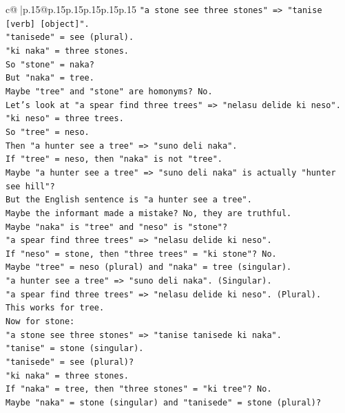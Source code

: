 \documentclass{article}
\begin{document}
{\begin{supertabular}{c@{$\;$}|p{.15\linewidth}@{}p{.15\linewidth}p{.15\linewidth}p{.15\linewidth}p{.15\linewidth}p{.15\linewidth}}
{{{\texttt{"a stone see three stones" => "tanise {[}verb{]} {[}object{]}".} \\
\texttt{"tanisede" = see (plural).} \\
\texttt{"ki naka" = three stones.} \\
\texttt{So "stone" = naka?} \\
\texttt{But "naka" = tree.} \\
\texttt{Maybe "tree" and "stone" are homonyms? No.} \\
\texttt{Let's look at "a spear find three trees" => "nelasu delide ki neso".} \\
\texttt{"ki neso" = three trees.} \\
\texttt{So "tree" = neso.} \\
\texttt{Then "a hunter see a tree" => "suno deli naka".} \\
\texttt{If "tree" = neso, then "naka" is not "tree".} \\
\texttt{Maybe "a hunter see a tree" => "suno deli naka" is actually "hunter see hill"?} \\
\texttt{But the English sentence is "a hunter see a tree".} \\
\texttt{Maybe the informant made a mistake? No, they are truthful.} \\
\texttt{Maybe "naka" is "tree" and "neso" is "stone"?} \\
\texttt{"a spear find three trees" => "nelasu delide ki neso".} \\
\texttt{If "neso" = stone, then "three trees" = "ki stone"? No.} \\
\texttt{Maybe "tree" = neso (plural) and "naka" = tree (singular).} \\
\texttt{"a hunter see a tree" => "suno deli naka". (Singular).} \\
\texttt{"a spear find three trees" => "nelasu delide ki neso". (Plural).} \\
\texttt{This works for tree.} \\
\texttt{Now for stone:} \\
\texttt{"a stone see three stones" => "tanise tanisede ki naka".} \\
\texttt{"tanise" = stone (singular).} \\
\texttt{"tanisede" = see (plural)?} \\
\texttt{"ki naka" = three stones.} \\
\texttt{If "naka" = tree, then "three stones" = "ki tree"? No.} \\
\texttt{Maybe "naka" = stone (singular) and "tanisede" = stone (plural)?} \\
}}}
\end{supertabular}}
\end{document}
